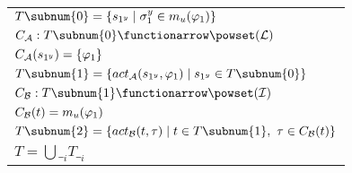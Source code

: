 \begin{definition} \begin{tabular}[t]{l} 

\vspace{0.075in}
{$T\subnum{0} = \{ s_{1^y}  \mid  \sigma_1^{y} \in m_u(\varphi_1) \} $}\\



{$C_{\cal A}:  T\subnum{0} \functionarrow \powset({\cal L})$}\\
\vspace{0.075in} 
{$C_{\cal A}(s_{1^y}) = \{ \varphi_1 \}$}\\ 


\vspace{0.075in}
{$T\subnum{1} = \{ act_{\cal A}(s_{1^y},\varphi_1) \mid s_{1^y} \in T\subnum{0} \}$}\\ %




{$C_{\cal B}: T\subnum{1} \functionarrow \powset({\cal I})$}\\
\vspace{0.075in} 
{$C_{\cal B}(t) = m_u(\varphi_1)$} \\
\vspace{0.075in}
{$T\subnum{2} = \{ act_{\cal B}(t, \tau) \mid t \in T\subnum{1},\ \tau \in C_{\cal B}(t) \}$}\\ 




{$T = \bigcup\__i T\__{i}$} \end{tabular}\label{def:A.3}\end{definition}


